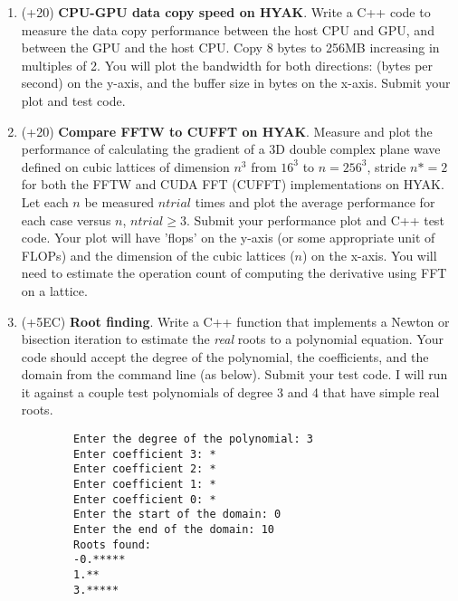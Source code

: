 \documentclass[10pt]{article}
\theoremstyle{definition}
\theoremstyle{remark}
\begin{document}
\begin{enumerate}
    \item (+20) \textbf{CPU-GPU data copy speed on HYAK}. Write a C++ code to measure the data copy performance between the host CPU and GPU, and between the GPU and the host CPU. Copy 8 bytes to 256MB increasing in multiples of 2. You will plot the bandwidth for both directions: (bytes per second) on the y-axis, and the buffer size in bytes on the x-axis. Submit your plot and test code.

    \item (+20) \textbf{Compare FFTW to CUFFT on HYAK}. Measure and plot the performance of calculating the gradient of a 3D double complex plane wave defined on cubic lattices of dimension $n^3$ from $16^3$ to $n=256^3$, stride $n*=2$ for both the FFTW and CUDA FFT (CUFFT) implementations on HYAK. Let each $n$ be measured $ntrial$ times and plot the average performance for each case versus $n$, $ntrial\geq 3$. Submit your performance plot and C++ test code. Your plot will have 'flops' on the y-axis (or some appropriate unit of FLOPs) and the dimension of the cubic lattices ($n$) on the x-axis. You will need to estimate the operation count of computing the derivative using FFT on a lattice. 

    \item (+5EC) \textbf{Root finding}. Write a C++ function that implements a Newton or bisection iteration to estimate the \textit{real} roots to a polynomial equation. Your code should accept the degree of the polynomial, the coefficients, and the domain from the command line (as below). Submit your test code. I will run it against a couple test polynomials of degree 3 and 4 that have simple real roots. 
    \begin{verbatim}
        Enter the degree of the polynomial: 3
        Enter coefficient 3: *
        Enter coefficient 2: *
        Enter coefficient 1: *
        Enter coefficient 0: *
        Enter the start of the domain: 0
        Enter the end of the domain: 10
        Roots found:
        -0.*****
        1.**
        3.*****
    \end{verbatim}
\end{enumerate}
\end{document}
